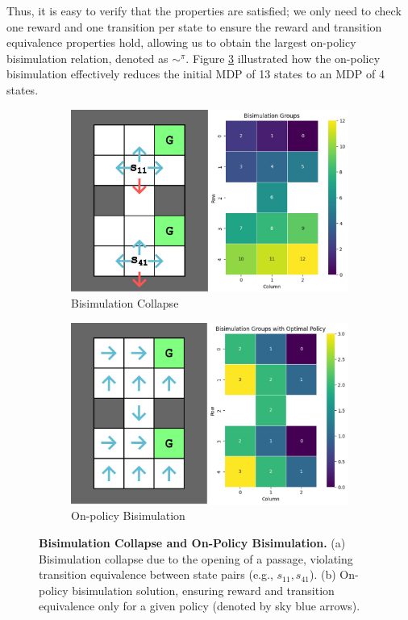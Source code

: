Thus, it is easy to verify that the properties are satisfied; we only need to check one reward and one transition per state to ensure the reward and transition equivalence properties hold, allowing us to obtain the largest on-policy bisimulation relation, denoted as $\sim^\pi$. Figure \ref{fig:on_policy_bisimulation} illustrated how the on-policy bisimulation effectively reduces the initial MDP of 13 states to an MDP of 4 states.

\begin{figure}[h]
    \centering
    \begin{subfigure}{0.45\textwidth}
    \includegraphics[width=\linewidth]{Figures/bisimulation_passage.jpg}
        \caption{Bisimulation Collapse}
        \label{fig:bisimulation_collapse}
    \end{subfigure}
    \hfill
    \begin{subfigure}{0.45\textwidth}
        \includegraphics[width=\linewidth]{Figures/on_policy_bisimulation.jpg}
        \caption{On-policy Bisimulation}
        \label{fig:on_policy_bisimulation}
    \end{subfigure}
    \caption[Bisimulation Collapse and On-Policy Bisimulation]{\textbf{Bisimulation Collapse and On-Policy Bisimulation.} (a) Bisimulation collapse due to the opening of a passage, violating transition equivalence between state pairs (e.g., \(s_{11}, s_{41}\)). (b) On-policy bisimulation solution, ensuring reward and transition equivalence only for a given policy (denoted by sky blue arrows).}

\end{figure}

